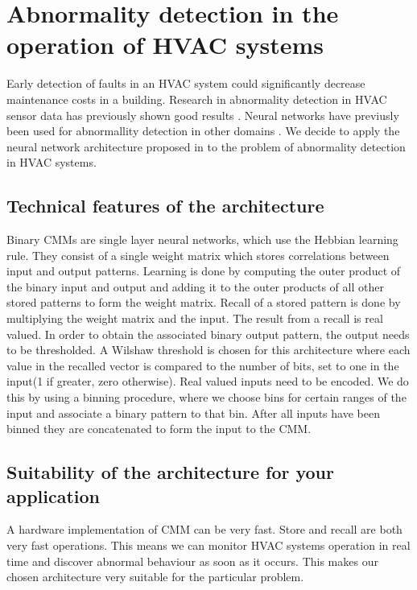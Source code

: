 \documentclass[a4paper, 11pt]{article}
\begin{document}
\section{Abnormality detection in the operation of HVAC systems}
Early detection of faults in an HVAC system could significantly decrease maintenance costs in a building. Research in abnormality detection in HVAC sensor data has previously shown good results \cite{Narayanaswamy2014}. Neural networks have previusly been used for abnormallity detection in other domains \cite{wrro89505}. We decide to apply the neural network architecture proposed in \cite{wrro89505} to the problem of abnormality detection in HVAC systems.
\subsection{Technical features of the architecture}

Binary CMMs are single layer neural networks, which use the Hebbian learning rule. They consist of a single weight matrix which stores correlations between input and output patterns. Learning is done by computing the outer product of the binary input and output and adding it to the outer products of all other stored patterns to form the weight matrix. Recall of a stored pattern is done by multiplying the weight matrix and the input. The result from a recall is real valued. In order to obtain the associated binary output pattern, the output needs to be thresholded. A Wilshaw threshold is chosen for this architecture where each value in the recalled vector is compared to the number of bits, set to one in the input(1 if greater, zero otherwise). Real valued inputs need to be encoded. We do this by using a binning procedure, where we choose bins for certain ranges of the input and associate a binary pattern to that bin. After all inputs have been binned they are concatenated to form the input to the CMM. 
\subsection{Suitability of the architecture for your application}
A hardware implementation of CMM can be very fast. Store and recall are both very fast operations. This means we can monitor HVAC systems operation in real time and discover abnormal behaviour as soon as it occurs. This makes our chosen architecture very suitable for the particular problem.
\end{document}
